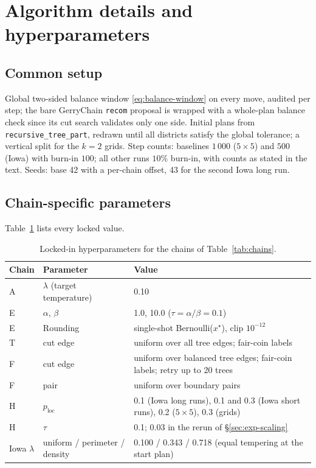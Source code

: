 \documentclass[11pt]{article}
\begin{document}
\appendix
\section{Algorithm details and hyperparameters}\label{app:hyperparams}

\subsection{Common setup}\label{app:common}

Global two-sided balance window \eqref{eq:balance-window} on every
move, audited per step; the bare GerryChain \texttt{recom} proposal is
wrapped with a whole-plan balance check since its cut search validates
only one side. Initial plans from \texttt{recursive\_tree\_part},
redrawn until all districts satisfy the global tolerance; a vertical
split for the $k = 2$ grids. Step counts: baselines $1\,000$
($5 \times 5$) and $500$ (Iowa) with burn-in $100$; all other runs
$10\%$ burn-in, with counts as stated in the text. Seeds: base 42 with
a per-chain offset, 43 for the second Iowa long run.

\subsection{Chain-specific parameters}\label{app:chains}

Table~\ref{tab:hyperparams} lists every locked value.
\begin{table}[htbp]
\centering
\footnotesize
\begin{tabular}{lll}
\toprule
Chain & Parameter & Value \\
\midrule
A & $\lambda$ (target temperature) & 0.10 \\
E & $\alpha$, $\beta$ & 1.0, 10.0 ($\tau = \alpha/\beta = 0.1$) \\
E & Rounding & single-shot Bernoulli($x^\star$), clip $10^{-12}$ \\
T & cut edge & uniform over all tree edges; fair-coin labels \\
F & cut edge & uniform over balanced tree edges; fair-coin labels; retry up to 20 trees \\
F & pair & uniform over boundary pairs \\
H & $p_{\mathrm{loc}}$ & 0.1 (Iowa long runs), 0.1 and 0.3 (Iowa short runs), 0.2 ($5 \times 5$), 0.3 (grids) \\
H & $\tau$ & 0.1; 0.03 in the rerun of \S\ref{sec:exp-scaling} \\
Iowa $\lambda$ & uniform / perimeter / density & 0.100 / 0.343 / 0.718 (equal tempering at the start plan) \\
\bottomrule
\end{tabular}
\caption{Locked-in hyperparameters for the chains of
  Table~\ref{tab:chains}.}\label{tab:hyperparams}
\end{table}
\end{document}

